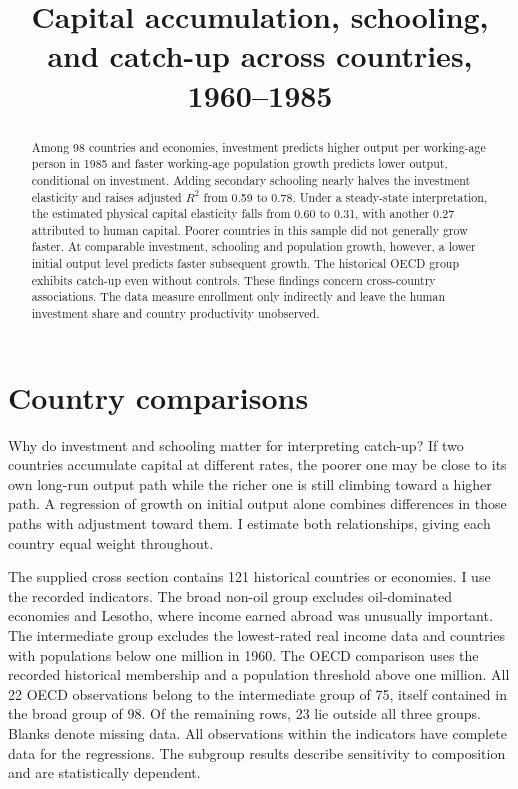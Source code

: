 \documentclass[11pt]{article}
\title{Capital accumulation, schooling, and catch-up across countries, 1960--1985}
\author{}
\date{}
\begin{document}
\maketitle
\begin{abstract}
Among 98 countries and economies, investment predicts higher output per working-age person in 1985 and faster working-age population growth predicts lower output, conditional on investment. Adding secondary schooling nearly halves the investment elasticity and raises adjusted $R^2$ from 0.59 to 0.78. Under a steady-state interpretation, the estimated physical capital elasticity falls from 0.60 to 0.31, with another 0.27 attributed to human capital. Poorer countries in this sample did not generally grow faster. At comparable investment, schooling and population growth, however, a lower initial output level predicts faster subsequent growth. The historical OECD group exhibits catch-up even without controls. These findings concern cross-country associations. The data measure enrollment only indirectly and leave the human investment share and country productivity unobserved.
\end{abstract}

\section{Country comparisons}
Why do investment and schooling matter for interpreting catch-up? If two countries accumulate capital at different rates, the poorer one may be close to its own long-run output path while the richer one is still climbing toward a higher path. A regression of growth on initial output alone combines differences in those paths with adjustment toward them. I estimate both relationships, giving each country equal weight throughout.

The supplied cross section contains 121 historical countries or economies. I use the recorded indicators. The broad non-oil group excludes oil-dominated economies and Lesotho, where income earned abroad was unusually important. The intermediate group excludes the lowest-rated real income data and countries with populations below one million in 1960. The OECD comparison uses the recorded historical membership and a population threshold above one million. All 22 OECD observations belong to the intermediate group of 75, itself contained in the broad group of 98. Of the remaining rows, 23 lie outside all three groups. Blanks denote missing data. All observations within the indicators have complete data for the regressions. The subgroup results describe sensitivity to composition and are statistically dependent.
\end{document}
